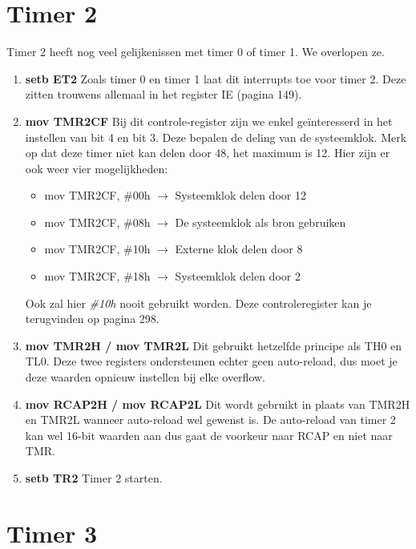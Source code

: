 \documentclass{report}
\begin{document}
\section{Timer 2}
Timer 2 heeft nog veel gelijkenissen met timer 0 of timer 1. We overlopen ze.
\begin{enumerate}
	\item \textbf{setb ET2}
	\newline
	Zoals timer 0 en timer 1 laat dit interrupts toe voor timer 2. Deze zitten trouwens allemaal in het register IE (pagina 149).
	\item \textbf{mov TMR2CF}
	\newline
	Bij dit controle-register zijn we enkel geïnteresserd in het instellen van bit 4 en bit 3. Deze bepalen  de deling van de systeemklok. Merk op dat deze timer niet kan delen door 48, het maximum is 12. Hier zijn er ook weer vier mogelijkheden:
	\begin{itemize}
		\item mov TMR2CF, \#00h $\rightarrow$ Systeemklok delen door 12
		\item mov TMR2CF, \#08h $\rightarrow$ De systeemklok als bron gebruiken
		\item mov TMR2CF, \#10h $\rightarrow$ Externe klok delen door 8
		\item mov TMR2CF, \#18h $\rightarrow$ Systeemklok delen door 2
	\end{itemize}
	Ook zal hier \textit{\#10h} nooit gebruikt worden. Deze controleregister kan je terugvinden op pagina 298.
	\item \textbf{mov TMR2H / mov TMR2L}
	\newline
	Dit gebruikt hetzelfde principe als TH0 en TL0. Deze twee registers ondersteunen echter geen auto-reload, dus moet je deze waarden opnieuw instellen bij elke overflow.
	\item \textbf{mov RCAP2H / mov RCAP2L}
	\newline
	Dit wordt gebruikt in plaats van TMR2H en TMR2L wanneer auto-reload wel gewenst is. De auto-reload van timer 2 kan wel 16-bit waarden aan dus gaat de voorkeur naar RCAP en niet naar TMR.
	\item \textbf{setb TR2}
	Timer 2 starten.
	
\end{enumerate}

\section{Timer 3}
\end{document}
